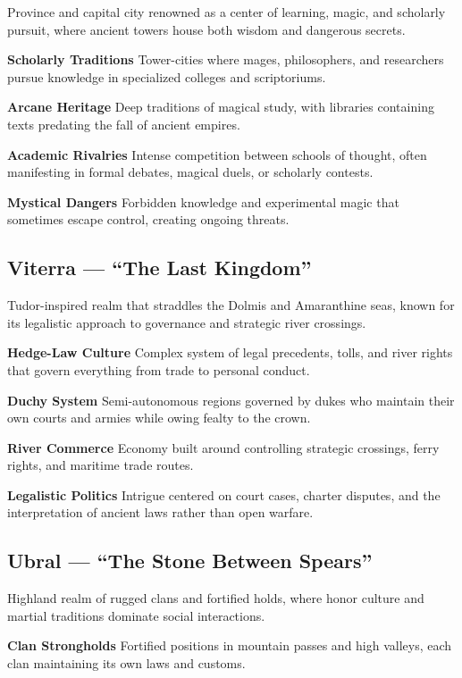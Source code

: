 \documentclass[11pt,twoside,openany]{book}
\begin{document}
Province and capital city renowned as a center of learning, magic, and scholarly pursuit, where ancient towers house both wisdom and dangerous secrets.

\textbf{Scholarly Traditions} Tower-cities where mages, philosophers, and researchers pursue knowledge in specialized colleges and scriptoriums.

\textbf{Arcane Heritage} Deep traditions of magical study, with libraries containing texts predating the fall of ancient empires.

\textbf{Academic Rivalries} Intense competition between schools of thought, often manifesting in formal debates, magical duels, or scholarly contests.

\textbf{Mystical Dangers} Forbidden knowledge and experimental magic that sometimes escape control, creating ongoing threats.

\subsection*{Viterra --- ``The Last Kingdom''}

Tudor-inspired realm that straddles the Dolmis and Amaranthine seas, known for its legalistic approach to governance and strategic river crossings.

\textbf{Hedge-Law Culture} Complex system of legal precedents, tolls, and river rights that govern everything from trade to personal conduct.

\textbf{Duchy System} Semi-autonomous regions governed by dukes who maintain their own courts and armies while owing fealty to the crown.

\textbf{River Commerce} Economy built around controlling strategic crossings, ferry rights, and maritime trade routes.

\textbf{Legalistic Politics} Intrigue centered on court cases, charter disputes, and the interpretation of ancient laws rather than open warfare.

\subsection*{Ubral --- ``The Stone Between Spears''}

Highland realm of rugged clans and fortified holds, where honor culture and martial traditions dominate social interactions.

\textbf{Clan Strongholds} Fortified positions in mountain passes and high valleys, each clan maintaining its own laws and customs.
\end{document}
